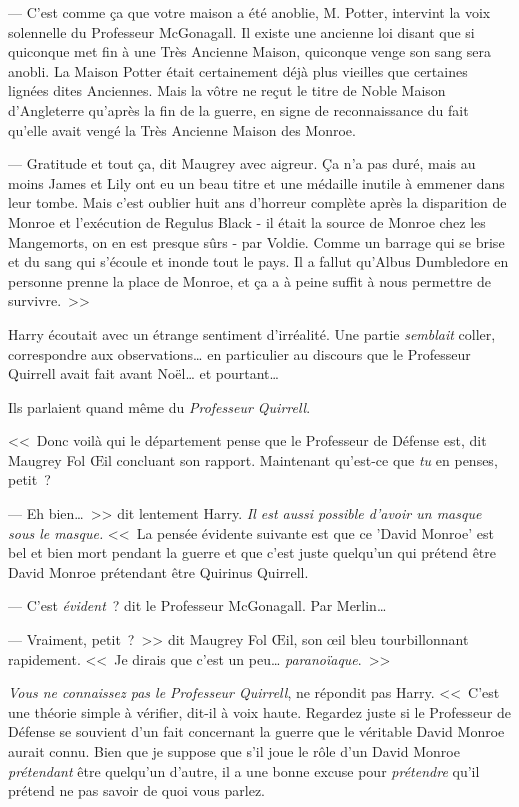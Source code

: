 --- C'est comme ça que votre maison a été anoblie, M. Potter, intervint la voix solennelle du Professeur McGonagall. Il existe une ancienne loi disant que si quiconque met fin à une Très Ancienne Maison, quiconque venge son sang sera anobli. La Maison Potter était certainement déjà plus vieilles que certaines lignées dites Anciennes. Mais la vôtre ne reçut le titre de Noble Maison d'Angleterre qu'après la fin de la guerre, en signe de reconnaissance du fait qu'elle avait vengé la Très Ancienne Maison des Monroe.

--- Gratitude et tout ça, dit Maugrey avec aigreur. Ça n'a pas duré, mais au moins James et Lily ont eu un beau titre et une médaille inutile à emmener dans leur tombe. Mais c'est oublier huit ans d'horreur complète après la disparition de Monroe et l'exécution de Regulus Black - il était la source de Monroe chez les Mangemorts, on en est presque sûrs - par Voldie. Comme un barrage qui se brise et du sang qui s'écoule et inonde tout le pays. Il a fallut qu'Albus Dumbledore en personne prenne la place de Monroe, et ça a à peine suffit à nous permettre de survivre.~>>

Harry écoutait avec un étrange sentiment d'irréalité. Une partie \emph{semblait} coller, correspondre aux observations… en particulier au discours que le Professeur Quirrell avait fait avant Noël… et pourtant…

Ils parlaient quand même du \emph{Professeur Quirrell}.

<<~Donc voilà qui le département pense que le Professeur de Défense est, dit Maugrey Fol Œil concluant son rapport. Maintenant qu'est-ce que \emph{tu} en penses, petit~?

--- Eh bien…~>> dit lentement Harry. \emph{Il est aussi possible d'avoir un masque sous le masque.} <<~La pensée évidente suivante est que ce 'David Monroe' est bel et bien mort pendant la guerre et que c'est juste quelqu'un qui prétend être David Monroe prétendant être Quirinus Quirrell.

--- C'est \emph{évident}~? dit le Professeur McGonagall. Par Merlin…

--- Vraiment, petit~?~>> dit Maugrey Fol Œil, son œil bleu tourbillonnant rapidement. <<~Je dirais que c'est un peu… \emph{paranoïaque}.~>>

\emph{Vous ne connaissez pas le Professeur Quirrell}, ne répondit pas Harry. <<~C'est une théorie simple à vérifier, dit-il à voix haute. Regardez juste si le Professeur de Défense se souvient d'un fait concernant la guerre que le véritable David Monroe aurait connu. Bien que je suppose que s'il joue le rôle d'un David Monroe \emph{prétendant} être quelqu'un d'autre, il a une bonne excuse pour \emph{prétendre} qu'il prétend ne pas savoir de quoi vous parlez.

